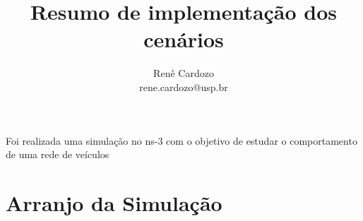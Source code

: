 \documentclass{article}
\author{Renê Cardozo \\ 
        rene.cardozo@usp.br}
\title{Resumo de implementação dos cenários}
\date{}
\begin{document}
\maketitle

Foi realizada uma simulação no ns-3 com o objetivo de estudar o comportamento de uma rede de veículos 
\section{Arranjo da Simulação}
\end{document}
